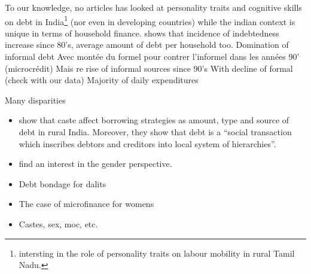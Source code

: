 \documentclass[a4paper, 11pt, onecolumn]{article}
\begin{document}
To our knowledge, no articles has looked at personality traits and cognitive skills on debt in India\footnote{\cite{Michiels2021} intersting in the role of personality traits on labour mobility in rural Tamil Nadu.} (nor even in developing countries) while the indian context is unique in terms of household finance.
\cite{Rajakumar2019} shows that incidence of indebtedness increase since 80's, average amount of debt per household too.
Domination of informal debt 
Avec montée du formel pour contrer l'informel dans les années 90' (microcrédit)
Mais re rise of informal sources since 90's
With decline of formal (check with our data)
Majority of daily expenditures






Many disparities 
\begin{itemize}
\item \cite{Guerin2013a} show that caste affect borrowing strategies as amount, type and source of debt in rural India.
Moreover, they show that debt is a ``social transaction which inscribes debtors and creditors into local system of hierarchies''.
\item \cite{Reboul2021} find an interest in the gender perspective.
\item Debt bondage for dalits \citep{Guerin2020a}
\item The case of microfinance for womens \citep{Guerin2020b}
\item  Castes, sex, moc, etc.  \citep{Guerin2012a} \citep{Guerin2013a} \citep{Guerin2014} \citep{Reboul2021}
\end{itemize}
\end{document}
